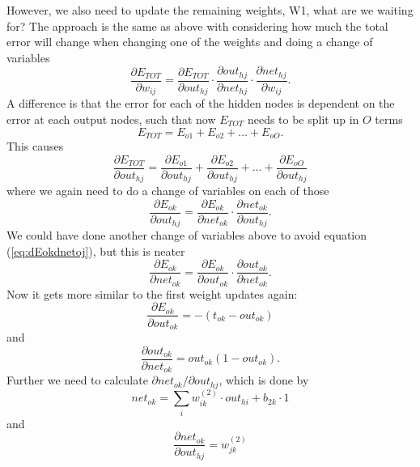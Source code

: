 However, we also need to update the remaining weights, W1, what are we waiting for? The approach is the same as above with considering how much the total error will change when changing one of the weights and doing a change of variables
\begin{equation}
\frac{\partial E_{TOT}}{\partial w_{ij}}=\frac{\partial E_{TOT}}{\partial out_{hj}}\cdot\frac{\partial out_{hj}}{\partial net_{hj}}\cdot\frac{\partial net_{hj}}{\partial w_{ij}}.
\end{equation}
A difference is that the error for each of the hidden nodes is dependent on the error at each output nodes, such that now $E_{TOT}$ needs to be split up in $O$ terms
\begin{equation}
E_{TOT}=E_{o1} + E_{o2} + \hdots + E_{oO}.
\end{equation}
This causes
\begin{equation}
\frac{\partial E_{TOT}}{\partial out_{hj}}=\frac{\partial E_{o1}}{\partial out_{hj}} + \frac{\partial E_{o2}}{\partial out_{hj}} + \hdots + \frac{\partial E_{oO}}{\partial out_{hj}}
\end{equation}
where we again need to do a change of variables on each of those
\begin{equation}
\frac{\partial E_{ok}}{\partial out_{hj}}=\frac{\partial E_{ok}}{\partial net_{ok}}\cdot\frac{\partial net_{ok}}{\partial out_{hj}}.
\end{equation}
We could have done another change of variables above to avoid equation (\ref{eq:dEokdnetoj}), but this is neater
\begin{equation}
\frac{\partial E_{ok}}{\partial net_{ok}}=\frac{\partial E_{ok}}{\partial out_{ok}}\cdot \frac{\partial out_{ok}}{\partial net_{ok}}.
\label{eq:dEokdnetoj}
\end{equation}
Now it gets more similar to the first weight updates again:
\begin{equation}
\frac{\partial E_{ok}}{\partial out_{ok}}=-(t_{ok}-out_{ok})
\end{equation}
and
\begin{equation}
\frac{\partial out_{ok}}{\partial net_{ok}} = out_{ok}(1-out_{ok}).
\end{equation}
Further we need to calculate $\partial net_{ok}/\partial out_{hj}$, which is done by
\begin{equation}
net_{ok} = \sum_i w_{ik}^{(2)}\cdot out_{hi} + b_{2k}\cdot 1
\end{equation}
and
\begin{equation}
\frac{\partial net_{ok}}{\partial out_{hj}}=w_{jk}^{(2)}
\end{equation}
